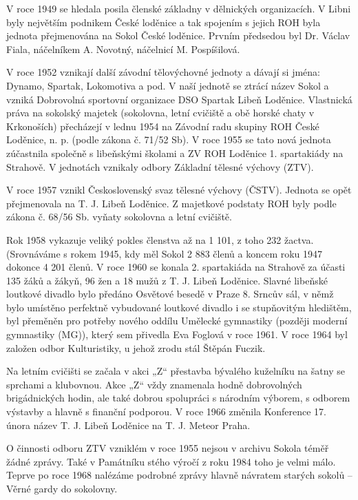 V roce 1949 se hledala posila členské základny v dělnických
organizacích. V Libni byly největším podnikem České loděnice a tak
spojením s jejich ROH byla jednota přejmenována na Sokol České loděnice.
Prvním předsedou byl Dr. Václav Fiala, náčelníkem A. Novotný, náčelnicí
M. Pospíšilová.

V roce 1952 vznikají další závodní tělovýchovné jednoty a dávají si
jména: Dynamo, Spartak, Lokomotiva a pod. V naší jednotě se ztrácí název
Sokol a vzniká Dobrovolná sportovní organizace DSO Spartak Libeň
Loděnice. Vlastnická práva na sokolský majetek (sokolovna, letní
cvičiště a obě horské chaty v Krkonoších) přecházejí v lednu 1954 na
Závodní radu skupiny ROH České Loděnice, n. p. (podle zákona č. 71/52
Sb). V roce 1955 se tato nová jednota zúčastnila společně s libeňskými
školami a ZV ROH Loděnice 1. spartakiády na Strahově. V jednotách
vznikaly odbory Základní tělesné výchovy (ZTV).

V roce 1957 vznikl Československý svaz tělesné výchovy (ČSTV). Jednota
se opět přejmenovala na T. J. Libeň Loděnice. Z majetkové podstaty ROH
byly podle zákona č. 68/56 Sb. vyňaty sokolovna a letní cvičiště.

Rok 1958 vykazuje veliký pokles členstva až na 1 101, z toho 232 žactva.
(Srovnáváme s rokem 1945, kdy měl Sokol 2 883 členů a koncem roku 1947
dokonce 4 201 členů. V roce 1960 se konala 2. spartakiáda na Strahově za
účasti 135 žáků a žákyň, 96 žen a 18 mužů z T. J. Libeň Loděnice. Slavné
libeňské loutkové divadlo bylo předáno Osvětové besedě v Praze 8. Srncův
sál, v němž bylo umístěno perfektně vybudované loutkové divadlo i se
stupňovitým hledištěm, byl přeměněn pro potřeby nového oddílu Umělecké
gymnastiky (později moderní gymnastiky (MG)), který sem přivedla Eva
Foglová v roce 1961. V roce 1964 byl založen odbor Kulturistiky, u jehož
zrodu stál Štěpán Fuczik.

Na letním cvičišti se začala v akci „Z`` přestavba bývalého kuželníku na
šatny se sprchami a klubovnou. Akce „Z`` vždy znamenala hodně
dobrovolných brigádnických hodin, ale také dobrou spolupráci s národním
výborem, s odborem výstavby a hlavně s finanční podporou. V roce 1966
změnila Konference 17. února název T. J. Libeň Loděnice na T. J. Meteor
Praha.

O činnosti odboru ZTV vzniklém v roce 1955 nejsou v archivu Sokola téměř
žádné zprávy. Také v Památníku stého výročí z roku 1984 toho je velmi
málo. Teprve po roce 1968 nalézáme podrobné zprávy hlavně návratem
starých sokolů -- Věrné gardy do sokolovny.

